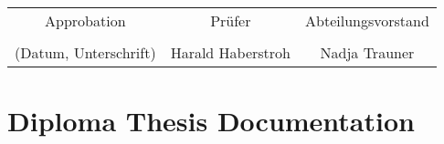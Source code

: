 \begin{center}
\\

\begin{tabular}{| c | c | c |}
    \hline
    Approbation & Prüfer & Abteilungsvorstand\\
    \\
    (Datum, Unterschrift) & Harald Haberstroh & Nadja Trauner\\ %
    \hline
\end{tabular}

\end{center}

\chapter{Diploma Thesis Documentation}
